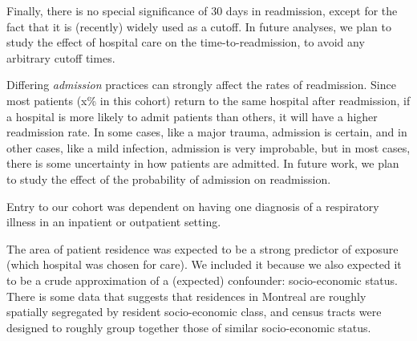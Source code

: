\documentclass[]{article}\usepackage[]{graphicx}\usepackage[]{color}
\begin{document}
Finally, there is no special significance of 30 days in readmission, except for the fact that it is (recently) widely used as a cutoff. In future analyses, we plan to study the effect of hospital care on the time-to-readmission, to avoid any arbitrary cutoff times.   

Differing \emph{admission} practices can strongly affect the rates of readmission. Since most patients (x\% in this cohort) return to the same hospital after readmission, if a hospital is more likely to admit patients than others, it will have a higher readmission rate. In some cases, like a major trauma, admission is certain, and in other cases, like a mild infection, admission is very improbable, but in most cases, there is some uncertainty in how patients are admitted. In future work, we plan to study the effect of the probability of admission on readmission.

Entry to our cohort was dependent on having one diagnosis of a respiratory illness in an inpatient or outpatient setting. 




 

The area of patient residence was expected to be a strong predictor of exposure (which hospital was chosen for care). We included it because we also expected it to be a crude approximation of a (expected) confounder: socio-economic status. There is some data that suggests that residences in Montreal are roughly spatially segregated by resident socio-economic class, and census tracts were designed to roughly group together those of similar socio-economic status.
\end{document}
